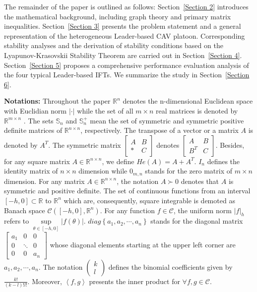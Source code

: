 \documentclass[a4paper]{cas-sc}
\begin{document}
The remainder of the paper is outlined as follows: Section~\ref{Section 2} introduces the mathematical background, including graph theory and primary matrix inequalities. Section~\ref{Section 3} presents the problem statement and a general representation of the heterogeneous Leader-based CAV platoon. Corresponding stability analyses and the derivation of stability conditions based on the Lyapunov-Krasovskii Stability Theorem are carried out in Section~\ref{Section 4}. Section~\ref{Section 5} proposes a comprehensive performance evaluation analysis of the four typical Leader-based IFTs. We summarize the study in Section~\ref{Section 6}.

\textbf{Notations:} Throughout the paper ${\mathbb{R}^n}$ denotes the n-dimensional Euclidean space with Euclidian norm $| \cdot |$  while the set of all $m \times n$ real matrices is denoted by ${\mathbb{R}^{m \times n}}$ . The sets $ {\mathbb{S}_n} $ and $\mathbb{S}_n^ + $ mean the set of symmetric and symmetric positive definite matrices of ${\mathbb{R}^{n \times n}}$, respectively. The transpose of a vector or a matrix $A $ is denoted by ${A^T} $. The symmetric matrix $\left[ {\begin{array}{*{20}{c}}
          A & B \\
          * & C
        \end{array}} \right]$ denotes $\left[ {\begin{array}{*{20}{c}}
          A       & B \\
          {{B^T}} & C
        \end{array}} \right]$. Besides, for any square matrix $ A \in {\mathbb{R}^{n \times n}}$, we define $ He\left( A \right) = A + {A^T}$. ${I_n} $ defines the identity matrix of $ n \times n $ dimension while ${0_{m,n}} $ stands for the zero matrix of $ m \times n$ dimension. For any matrix $A \in {\mathbb{R}^{n \times n}} $, the notation $ A \succ 0$ denotes that $A $ is symmetric and positive definite. The set of continuous functions from an interval $\left[ { - h,0} \right] \subset \mathbb{R}$ to ${\mathbb{R}^n}$ which are, consequently, square integrable is demoted as Banach space $\mathcal{C}\left( {\left[ { - h,0} \right],{\mathbb{R}^n}} \right)$. For any function $f \in \mathcal{C}$, the uniform norm $|f{|_h}$ refers to $\mathop {\sup }\limits_{\theta  \in [ - h,0]} |f(\theta )|$. $diag\left\{ {{a_1},{a_2}, \cdots ,{a_n}} \right\}$ stands for the diagonal matrix $\left[ {\begin{array}{*{20}{c}}
          {{a_1}} & 0      & 0       \\
          0       & \ddots & 0       \\
          0       & 0      & {{a_n}}
        \end{array}} \right]$ whose diagonal elements starting at the upper left corner are ${a_1},{a_2}, \cdots ,{a_n}$. The notation $\left( {\begin{array}{*{20}{c}}
      k \\
      l
    \end{array}} \right)$ defines the binomial coefficients given by $\frac{{k!}}{{\left( {k - l} \right)!l!}}$. Moreover, $\left\langle {f,g} \right\rangle $ presents the inner product for $\forall f,g \in \mathcal{C}$.\\
\end{document}
